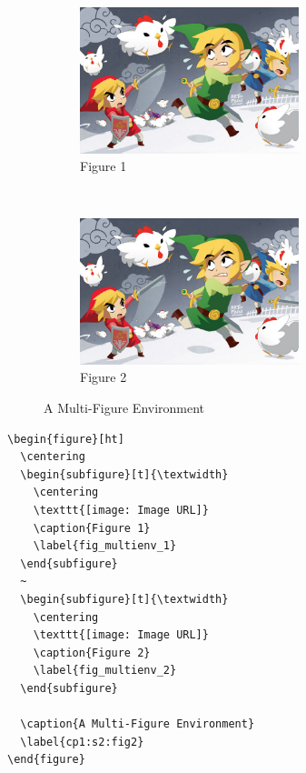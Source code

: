 \documentclass[12pt]{report}
\begin{document}
\begin{figure}[ht]
	\centering
	\begin{subfigure}[t]{\textwidth}
		\centering
		\includegraphics[width=0.7\textwidth]{figures/Sample/tumblr_static_eaceks0rfxsss8o4swscw40wo.jpg}
		\caption{Figure 1}
		\label{fig_multienv_1}
	\end{subfigure}
	~
	\begin{subfigure}[t]{\textwidth}
		\centering
		\includegraphics[width=0.7\textwidth]{figures/Sample/tumblr_static_eaceks0rfxsss8o4swscw40wo.jpg}
		\caption{Figure 2}
		\label{fig_multienv_2}
	\end{subfigure}
	
	\caption{A Multi-Figure Environment}
	\label{cp1:s2:fig2}
\end{figure}

\begin{verbatim}
\begin{figure}[ht]
  \centering
  \begin{subfigure}[t]{\textwidth}
    \centering
    \texttt{[image: Image URL]}
    \caption{Figure 1}
    \label{fig_multienv_1}
  \end{subfigure}
  ~
  \begin{subfigure}[t]{\textwidth}
    \centering
    \texttt{[image: Image URL]}
    \caption{Figure 2}
    \label{fig_multienv_2}
  \end{subfigure}

  \caption{A Multi-Figure Environment}
  \label{cp1:s2:fig2}
\end{figure}
\end{verbatim}
\end{document}
